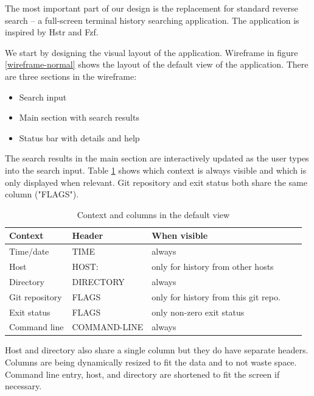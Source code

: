 The most important part of our design is the replacement for standard reverse search -- a full-screen terminal history searching application. The application is inspired by Hstr and Fzf. 

We start by designing the visual layout of the application.
Wireframe in figure \ref{wireframe-normal} shows the layout of the default view of the application. There are three sections in the wireframe:

\begin{itemize}
    \item Search input
    \item Main section with search results
    \item Status bar with details and help
\end{itemize}




The search results in the main section are interactively updated as the user types into the search input. Table \ref{tab:design-columns} shows which context is always visible and which is only displayed when relevant. Git repository and exit status both share the same column ("FLAGS").  

\begin{table}[h]
\centering
\begin{tabular}{lllll}
\hline \hline
Context        & Header       & When visible                        \\\hline
Time/date      & TIME         & always                              \\ 
Host           & HOST:        & only for history from other hosts   \\ 
Directory      & DIRECTORY    & always                              \\ 
Git repository & FLAGS        & only for history from this git repo. \\ 
Exit status    & FLAGS        & only non-zero exit status           \\ 
Command line   & COMMAND-LINE & always                              \\\hline \hline
\end{tabular}
\caption{Context and columns in the default view}
\label{tab:design-columns}
\end{table}

Host and directory also share a single column but they do have separate headers. Columns are being dynamically resized to fit the data and to not waste space. Command line entry, host, and directory are shortened to fit the screen if necessary. 

